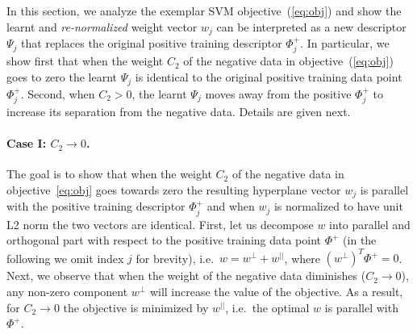 \documentclass[table]{article} %
\begin{document}
In this section, we analyze the exemplar SVM objective~(\ref{eq:obj}) and show the learnt and {\em re-normalized} weight vector $w_j$ can be interpreted as 
a new descriptor $\Psi_j$ that replaces the original positive training descriptor $\Phi^+_j$.  In particular, we show first that when the weight $C_2$ of the negative data in objective~(\ref{eq:obj}) goes to zero the learnt $\Psi_j$ is identical to the original positive training data point $\Phi_j^+$.  Second, when $C_2>0$, the learnt $\Psi_j$ moves away from the positive $\Phi_j^+$ to increase its separation from the negative data. %
Details are given next.



\paragraph{Case I: $C_2\rightarrow 0$.}
The goal is to show that when the weight  $C_2$ of the negative data in objective~\eqref{eq:obj} goes towards zero the resulting hyperplane vector $w_j$ is parallel with the positive training descriptor $\Phi_j^+$ and when $w_j$ is normalized to have unit L2 norm the two vectors are identical.
		First, let us decompose $w$ into parallel and orthogonal part with respect to the positive training data point $\Phi^+$ (in the following we omit index $j$ for brevity), i.e.\
$w=w^{\perp}+w^{||}$, where $(w^{\perp})^T \Phi^+ = 0$. Next, we observe that when the weight of the negative data diminishes ($C_2\rightarrow 0$), any non-zero component $w^{\perp}$ will increase the value of the objective. As a result, for $C_2\rightarrow 0$ the objective is minimized by $w^{||}$, i.e.\ the optimal $w$ is parallel with $\Phi^+$. %
 
\end{document}
